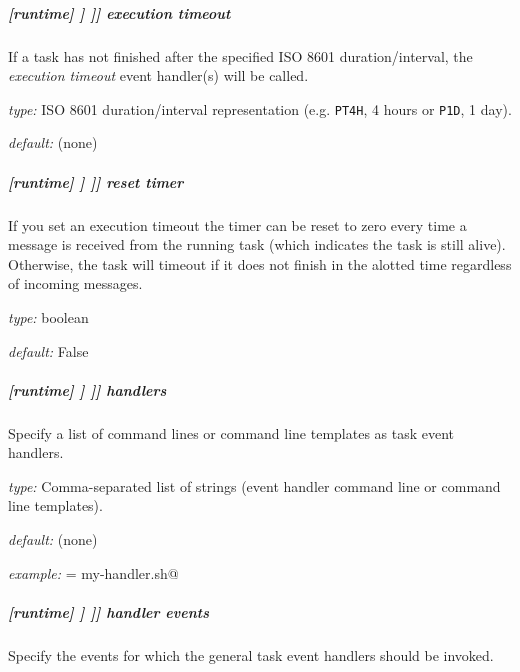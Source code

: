 \subparagraph[execution timeout]{[runtime] \textrightarrow [[\_\_NAME\_\_]] \textrightarrow [[[events]]] \textrightarrow execution timeout}
\label{runtime-event-hooks-execution-timeout}

If a task has not finished after the specified ISO 8601 duration/interval, the
{\em execution timeout} event handler(s) will be called.
\begin{myitemize}
    \item {\em type:} ISO 8601 duration/interval representation (e.g.
 \lstinline=PT4H=, 4 hours or \lstinline=P1D=, 1 day).
    \item {\em default:} (none)
\end{myitemize}

\subparagraph[reset timer]{[runtime] \textrightarrow [[\_\_NAME\_\_]] \textrightarrow [[[events]]] \textrightarrow reset timer}
\label{runtime-event-hooks-reset-timer}

If you set an execution timeout the timer can be reset to zero every
time a message is received from the running task (which indicates the
task is still alive).  Otherwise, the task will timeout if it does not
finish in the alotted time regardless of incoming messages.

\begin{myitemize}
\item {\em type:} boolean
\item {\em default:} False
\end{myitemize}

\subparagraph[handlers]{[runtime] \textrightarrow [[\_\_NAME\_\_]] \textrightarrow [[[events]]] \textrightarrow handlers}

Specify a list of command lines or command line templates as task event handlers.

\begin{myitemize}
    \item {\em type:} Comma-separated list of strings (event handler command line or command line templates).
    \item {\em default:} (none)
    \item {\em example:} \lstinline@handlers = my-handler.sh@
\end{myitemize}

\subparagraph[handler events]{[runtime] \textrightarrow [[\_\_NAME\_\_]] \textrightarrow [[[events]]] \textrightarrow handler events}

Specify the events for which the general task event handlers should be invoked.

